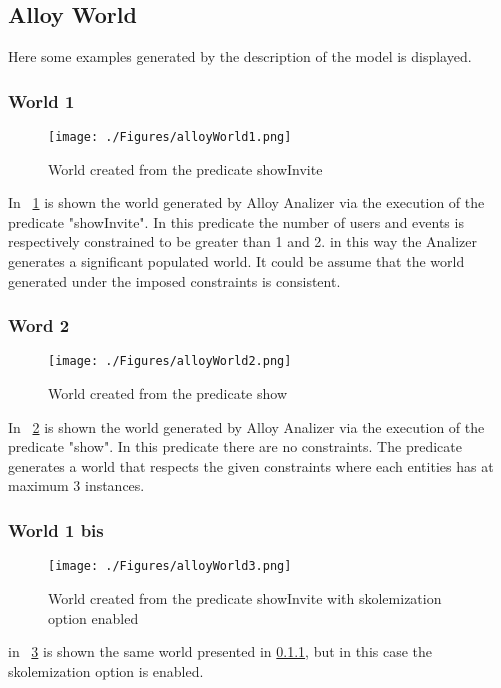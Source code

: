 \subsection{Alloy World}
Here some examples generated by the description of the model is displayed.
\subsubsection{World 1}
\label{w1}
\begin{figure}
	\centerline{\texttt{[image: ./Figures/alloyWorld1.png]}}
	\caption{World created from the predicate showInvite}
	\label{aw1}
\end{figure}

In \figurename~\ref{aw1} is shown the world generated by Alloy Analizer via the execution of the predicate "showInvite". In this predicate the number of users and events is respectively constrained to be greater than 1 and 2. in this way the Analizer generates a significant populated world. It could be assume that the world generated under the imposed constraints is consistent.

\subsubsection{Word 2}
\begin{figure}
	\centerline{\texttt{[image: ./Figures/alloyWorld2.png]}}
	\caption{World created from the predicate show}
	\label{aw2}
\end{figure}

In \figurename~\ref{aw2} is shown the world generated by Alloy Analizer via the execution of the predicate "show". In this predicate there are no constraints. The predicate generates a world that respects the given constraints where each entities has at maximum 3 instances.

\subsubsection{World 1 bis}
\begin{figure}
	\centerline{\texttt{[image: ./Figures/alloyWorld3.png]}}
	\caption{World created from the predicate showInvite with skolemization option enabled}
	\label{aw3}
\end{figure}

in \figurename~\ref{aw3} is shown the same world presented in \ref{w1}, but in this case the skolemization option is enabled.

